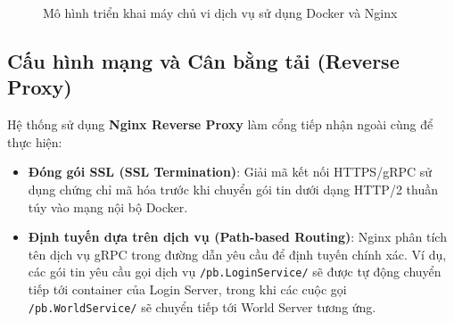 \documentclass[../Project.tex]{subfiles}
\begin{document}
\begin{figure}[H]
\caption{Mô hình triển khai máy chủ vi dịch vụ sử dụng Docker và Nginx}
\label{fig:deployment_model}
\end{figure}

\subsection{Cấu hình mạng và Cân bằng tải (Reverse Proxy)}
Hệ thống sử dụng \textbf{Nginx Reverse Proxy} làm cổng tiếp nhận ngoài cùng để thực hiện:
\begin{itemize}
    \item \textbf{Đóng gói SSL (SSL Termination)}: Giải mã kết nối HTTPS/gRPC sử dụng chứng chỉ mã hóa trước khi chuyển gói tin dưới dạng HTTP/2 thuần túy vào mạng nội bộ Docker.
    \item \textbf{Định tuyến dựa trên dịch vụ (Path-based Routing)}: Nginx phân tích tên dịch vụ gRPC trong đường dẫn yêu cầu để định tuyến chính xác. Ví dụ, các gói tin yêu cầu gọi dịch vụ \texttt{/pb.LoginService/} sẽ được tự động chuyển tiếp tới container của Login Server, trong khi các cuộc gọi \texttt{/pb.WorldService/} sẽ chuyển tiếp tới World Server tương ứng.
\end{itemize}
\end{document}
